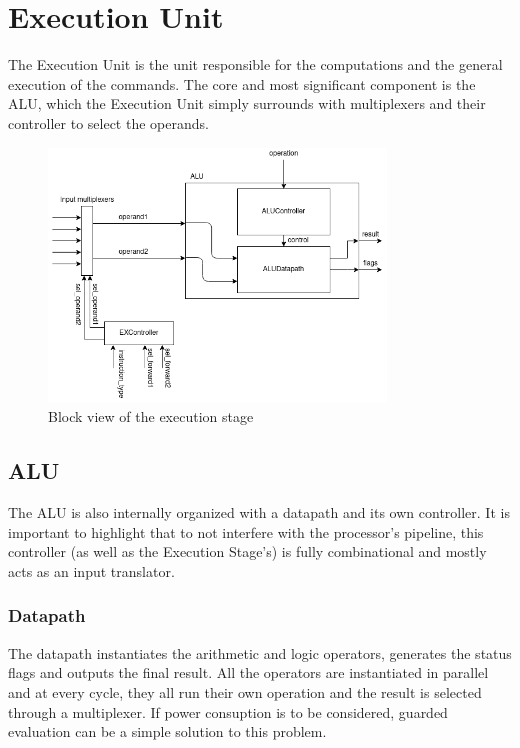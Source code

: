 \section{Execution Unit}
The Execution Unit is the unit responsible for the computations and the general execution of the commands.
The core and most significant component is the ALU, which the Execution Unit simply surrounds with multiplexers
and their controller to select the operands.

\begin{figure}[htbp]
    \center
	\includegraphics[width=0.8\textwidth]{./2-implementation/images/ExStage.png}
	\caption{Block view of the execution stage}
	\label{fig:exstage}
\end{figure}

\subsection{ALU}
The ALU is also internally organized with a datapath and its own controller. It is important to highlight that to not
interfere with the processor's pipeline, this controller (as well as the Execution Stage's) is fully combinational and
mostly acts as an input translator.

\subsubsection{Datapath}
The datapath instantiates the arithmetic and logic operators, generates the status flags and outputs the final result.
All the operators are instantiated in parallel and at every cycle, they all run their own operation and the result
is selected through a multiplexer. If power consuption is to be considered, guarded evaluation can be a simple
solution to this problem.

